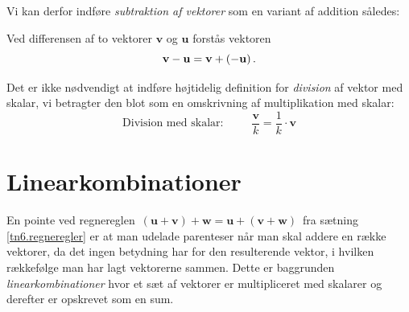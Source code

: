 Vi kan derfor indføre \textit{subtraktion af vektorer} som en variant af addition således:\\

\begin{definition}[Subtraktion]
Ved differensen af to vektorer $\mathbf v$ og $\mathbf u$ forstås vektoren
\begin{equation}
\mathbf{v} -\mathbf u = \mathbf{v}+( -\mathbf u)\,.
\end{equation}
\end{definition}
 

\begin{aha}
Det er ikke nødvendigt at indføre højtidelig definition for \textit{division} af vektor med skalar, vi betragter den blot som en omskrivning af multiplikation med skalar:
$$\mathrm{Division\,\, med\,\, skalar:}\quad\quad\,\, \frac {\mathbf v} k = \frac 1 k \cdot \mathbf v$$
\end{aha}
\section{Linearkombinationer}
En pointe ved regnereglen 
$\, (\mathbf u + \mathbf v ) + \mathbf w = \mathbf u + (\mathbf v + \mathbf w)\, $ fra sætning \ref{tn6.regneregler} er at man udelade parenteser når man skal addere en række vektorer, da det ingen betydning har for den resulterende vektor, i hvilken rækkefølge man har lagt vektorerne sammen. Dette er baggrunden \textit{linearkombinationer} hvor et sæt af vektorer er multipliceret med skalarer og derefter er opskrevet som en sum.\\

